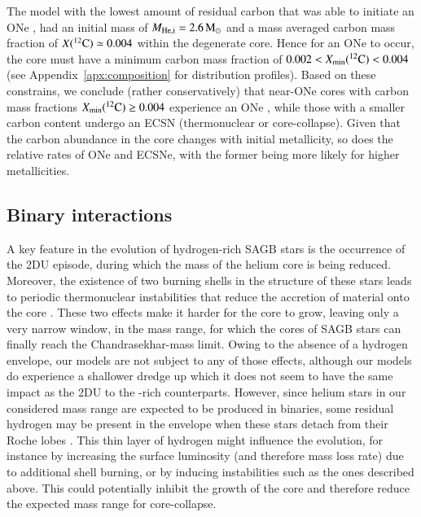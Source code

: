 \documentclass[main.tex]{subfiles}
\begin{document}
The  model with the lowest amount of residual carbon that was able to initiate an ONe \ia, 
had an initial mass of $M_{\rm He, i}=2.6\msun$ and a mass averaged carbon mass fraction of $X(\iso{C}{12})\simeq 0.004$ within the degenerate core. 
Hence for an ONe \ia to occur, the core must have a minimum carbon mass fraction of $0.002 < X_{\rm min}(\iso{C}{12}) < 0.004$ (see Appendix~\ref{apx:composition} for distribution profiles).  
Based on these constrains, we conclude (rather conservatively) that near-\mch  ONe cores with carbon mass fractions $X_{\rm min}(\iso{C}{12}) \geq 0.004$ experience an ONe \ia, while those with a smaller carbon content undergo an ECSN (thermonuclear or core-collapse).
Given that the carbon abundance in the core changes with initial metallicity, so does the relative rates of ONe \ias and ECSNe, with the former being more likely for higher metallicities. 




\subsection{Binary interactions}

A key feature in the evolution of hydrogen-rich SAGB stars is the occurrence of the 
2DU episode, during which the mass of the helium core is being reduced. Moreover, the existence of two 
burning shells in the structure of these stars leads to periodic thermonuclear instabilities 
that reduce the accretion of material onto the core \citep{Denissenkov:2013qaa}. 
These two effects make it harder for the 
core to grow, leaving only a very narrow window, in the mass range, for which the cores of SAGB 
stars can finally reach the Chandrasekhar-mass limit. Owing to the absence of a hydrogen envelope, 
our models are not subject to any of those effects, although our models do experience a shallower dredge up which it does not seem to have the same impact as the 2DU to the -rich counterparts. However, since helium stars in our considered mass range are expected to be produced in binaries, some residual hydrogen may be present in the envelope when these stars detach from their Roche lobes \citep[][and references therein]{Sen:2022abc}. This thin layer of hydrogen might  
influence the evolution, for instance by increasing the surface luminosity (and therefore mass loss rate) due to additional shell burning, or by inducing  instabilities such as the ones described above. This could potentially inhibit the growth of the core and therefore reduce the expected mass range for core-collapse.  
\end{document}
